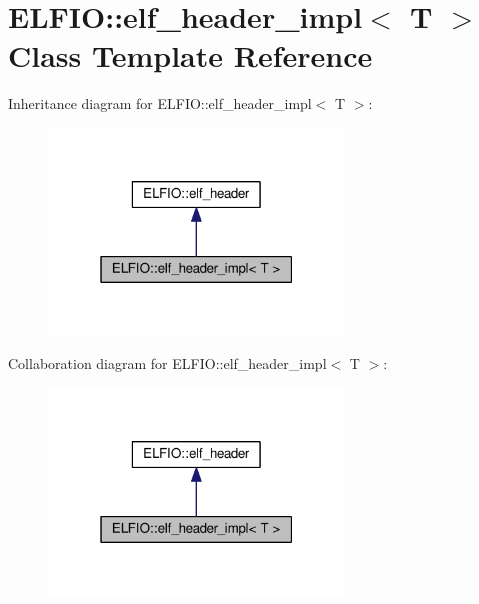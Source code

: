 \hypertarget{class_e_l_f_i_o_1_1elf__header__impl}{}\section{E\+L\+F\+IO\+:\+:elf\+\_\+header\+\_\+impl$<$ T $>$ Class Template Reference}
\label{class_e_l_f_i_o_1_1elf__header__impl}


Inheritance diagram for E\+L\+F\+IO\+:\+:elf\+\_\+header\+\_\+impl$<$ T $>$\+:\nopagebreak
\begin{figure}[H]
\begin{center}
\leavevmode
\includegraphics[width=223pt]{class_e_l_f_i_o_1_1elf__header__impl__inherit__graph}
\end{center}
\end{figure}


Collaboration diagram for E\+L\+F\+IO\+:\+:elf\+\_\+header\+\_\+impl$<$ T $>$\+:\nopagebreak
\begin{figure}[H]
\begin{center}
\leavevmode
\includegraphics[width=223pt]{class_e_l_f_i_o_1_1elf__header__impl__coll__graph}
\end{center}
\end{figure}
